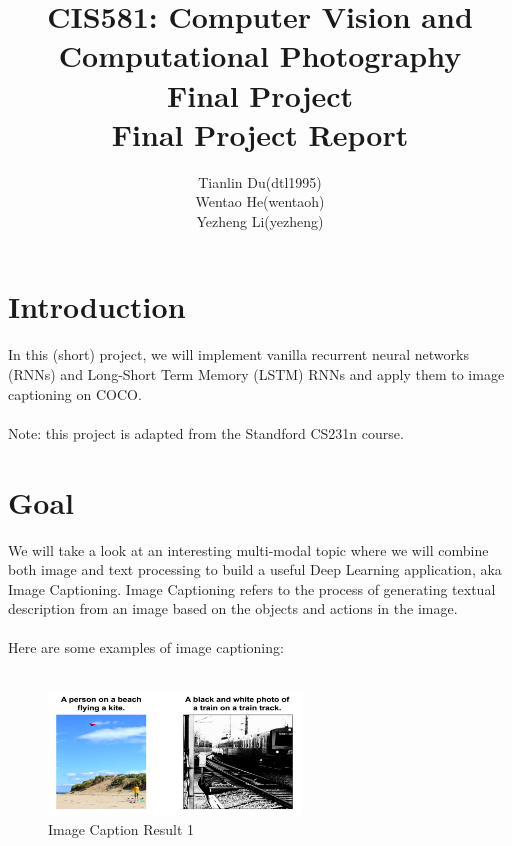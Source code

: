 \documentclass[english]{article}
\title{CIS581: Computer Vision and Computational Photography\\Final Project\\Final Project Report}
\author{%
 \begin{tabular}{rl}
 Tianlin Du&(dtl1995) \tabularnewline
  Wentao He&(wentaoh) \tabularnewline
  Yezheng Li&(yezheng)
\end{tabular}
}
\begin{document}
\maketitle

\section{Introduction}
In this (short) project, we will implement vanilla recurrent neural networks (RNNs) and Long-Short Term Memory (LSTM) RNNs and apply them to image captioning on COCO.\\\\
Note: this project is adapted from the Standford CS231n course.

\section{Goal}
We will take a look at an interesting multi-modal topic where we will combine both image and text processing to build a useful Deep Learning application, aka Image Captioning. Image Captioning refers to the process of generating textual description from an image based on the objects and actions in the image.\\\\
Here are some examples of image captioning:\\\\
        \begin{figure}[H]
          \centering
          \includegraphics[width=0.6\textwidth]{Picture1.png}
          \caption{Image Caption Result 1}
        \end{figure}
\end{document}
